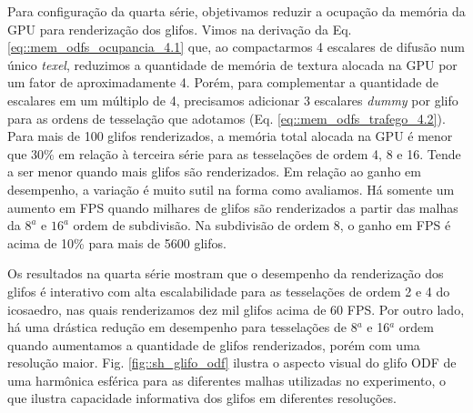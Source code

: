 Para configuração da quarta série, objetivamos reduzir a ocupação da memória da GPU para renderização dos glifos. Vimos na derivação da Eq. \ref{eq::mem_odfs_ocupancia_4.1} que, ao compactarmos 4 escalares de difusão num único \textit{texel}, reduzimos a quantidade de memória de textura alocada na GPU por um fator de aproximadamente 4. Porém, para complementar a quantidade de escalares em um múltiplo de 4, precisamos adicionar 3 escalares \textit{dummy} por glifo para as ordens de tesselação que adotamos (Eq. \ref{eq::mem_odfs_trafego_4.2}). Para mais de 100 glifos renderizados, a memória total alocada na GPU é menor que $30\%$ em relação à terceira série para as tesselações de ordem 4, 8 e 16. Tende a ser menor quando mais glifos são renderizados. Em relação ao ganho em desempenho, a variação é muito sutil na forma como avaliamos. Há somente um aumento em FPS quando milhares de glifos são renderizados a partir das malhas da $8^a$ e $16^a$ ordem de subdivisão. Na subdivisão de ordem 8, o ganho em FPS é acima de 10\% para mais de 5600 glifos. %


Os resultados na quarta série mostram que o desempenho da renderização dos glifos é interativo com alta escalabilidade para as tesselações de ordem 2 e 4 do icosaedro, nas quais renderizamos dez mil glifos acima de 60 FPS. Por outro lado, há uma drástica redução em desempenho para tesselações de 8$^a$ e 16$^a$ ordem quando aumentamos a quantidade de glifos renderizados, porém com uma resolução maior. Fig. \ref{fig::sh_glifo_odf} ilustra o aspecto visual do glifo ODF de uma harmônica esférica para as diferentes malhas utilizadas no experimento, o que ilustra capacidade informativa dos glifos em diferentes resoluções.

